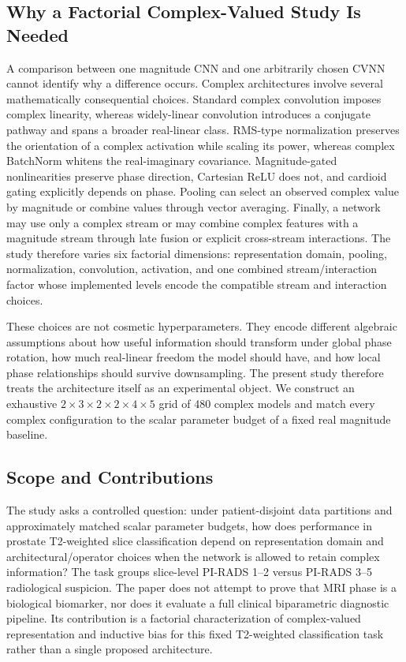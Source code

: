 \subsection{Why a Factorial Complex-Valued Study Is Needed}
A comparison between one magnitude CNN and one arbitrarily chosen CVNN cannot identify why a difference occurs. Complex architectures involve several mathematically consequential choices. Standard complex convolution imposes complex linearity, whereas widely-linear convolution introduces a conjugate pathway and spans a broader real-linear class. RMS-type normalization preserves the orientation of a complex activation while scaling its power, whereas complex BatchNorm whitens the real-imaginary covariance. Magnitude-gated nonlinearities preserve phase direction, Cartesian ReLU does not, and cardioid gating explicitly depends on phase. Pooling can select an observed complex value by magnitude or combine values through vector averaging. Finally, a network may use only a complex stream or may combine complex features with a magnitude stream through late fusion or explicit cross-stream interactions. The study therefore varies six factorial dimensions: representation domain, pooling, normalization, convolution, activation, and one combined stream/interaction factor whose implemented levels encode the compatible stream and interaction choices.

These choices are not cosmetic hyperparameters. They encode different algebraic assumptions about how useful information should transform under global phase rotation, how much real-linear freedom the model should have, and how local phase relationships should survive downsampling. The present study therefore treats the architecture itself as an experimental object. We construct an exhaustive $2\times3\times2\times2\times4\times5$ grid of 480 complex models and match every complex configuration to the scalar parameter budget of a fixed real magnitude baseline.

\subsection{Scope and Contributions}
The study asks a controlled question: under patient-disjoint data partitions and approximately matched scalar parameter budgets, how does performance in prostate T2-weighted slice classification depend on representation domain and architectural/operator choices when the network is allowed to retain complex information? The task groups slice-level PI-RADS 1--2 versus PI-RADS 3--5 radiological suspicion. The paper does not attempt to prove that MRI phase is a biological biomarker, nor does it evaluate a full clinical biparametric diagnostic pipeline. Its contribution is a factorial characterization of complex-valued representation and inductive bias for this fixed T2-weighted classification task rather than a single proposed architecture.


